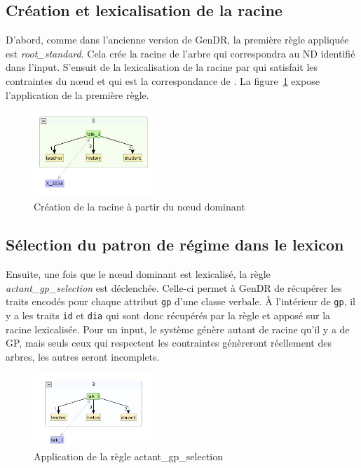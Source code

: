 \subsection{Création et lexicalisation de la racine}
D'abord, comme dans l'ancienne version de GenDR, la première règle appliquée est \emph{root\_standard}. Cela crée la racine de l'arbre qui correspondra au \ac{ND} identifié dans l'input. S'ensuit de la lexicalisation de la racine par  qui satisfait les contraintes du n\oe{}ud et qui est la correspondance de . La figure~\ref{deroulement0} expose l'application de la première règle.
\begin{figure}[htb]
	\centering
	\includegraphics[width=0.4\textwidth, trim = {0cm 0cm 0cm 0cm},clip]{ch6/figs/root.png}
	\caption{Création de la racine à partir du n\oe{}ud dominant}
	\label{deroulement0}
\end{figure}


\subsection{Sélection du patron de régime dans le lexicon}
Ensuite, une fois que le n\oe{}ud dominant est lexicalisé, la règle \emph{actant\_gp\_selection} est déclenchée. Celle-ci permet à GenDR de récupérer les traits encodés pour chaque attribut \texttt{gp} d'une classe verbale. À l'intérieur de \texttt{gp}, il y a les traits \texttt{id} et \texttt{dia} qui sont donc récupérés par la règle et apposé sur la racine lexicalisée. Pour un input, le système génère autant de racine qu'il y a de GP, mais seuls ceux qui respectent les contraintes génèreront réellement des arbres, les autres seront incomplets.

\begin{figure}[htb]
	\centering
	\includegraphics[width=0.4\textwidth, trim = {0cm 0cm 0cm 0cm},clip]{ch6/figs/selectiongp.png}
	\caption{Application de la règle actant\_gp\_selection}
	\label{deroulement1}
\end{figure}

